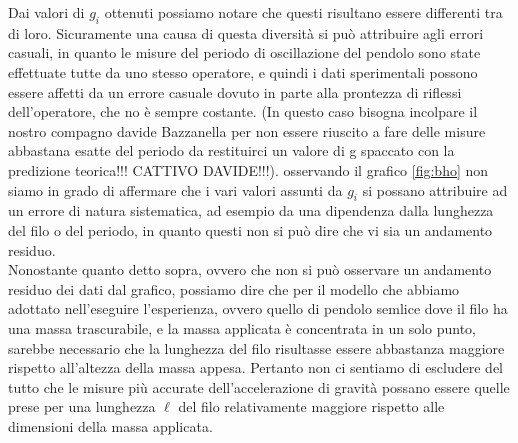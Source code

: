 Dai valori di $g_i$ ottenuti possiamo notare che questi risultano essere differenti tra di loro. Sicuramente una causa di questa diversità si può attribuire agli errori casuali, in quanto le misure del periodo di oscillazione del pendolo sono state effettuate tutte da uno stesso operatore, e quindi i dati sperimentali possono essere affetti da un errore casuale dovuto in parte alla prontezza di riflessi dell'operatore, che no è sempre costante. (In questo caso bisogna incolpare il nostro compagno davide Bazzanella per non essere riuscito a fare delle misure abbastana esatte del periodo da restituirci un valore di g spaccato con la predizione teorica!!! CATTIVO DAVIDE!!!). osservando il grafico \ref{fig:bho} non siamo in grado di affermare che i vari valori assunti da $g_i$ si possano attribuire ad un errore di natura sistematica, ad esempio da una dipendenza dalla lunghezza del filo o del periodo, in quanto questi non si può dire che vi sia un andamento residuo.\\
Nonostante quanto detto sopra, ovvero che non si può osservare un andamento residuo dei dati dal grafico, possiamo dire che per il modello che abbiamo adottato nell'eseguire l'esperienza, ovvero quello di pendolo semlice dove il filo ha una massa trascurabile, e la massa applicata è concentrata in un solo punto, sarebbe necessario che la lunghezza del filo risultasse essere abbastanza maggiore rispetto all'altezza della massa appesa. Pertanto non ci sentiamo di escludere del tutto che le misure più accurate dell'accelerazione di gravità possano essere quelle prese per una lunghezza $\ell$ del filo relativamente maggiore rispetto alle dimensioni della massa applicata.
